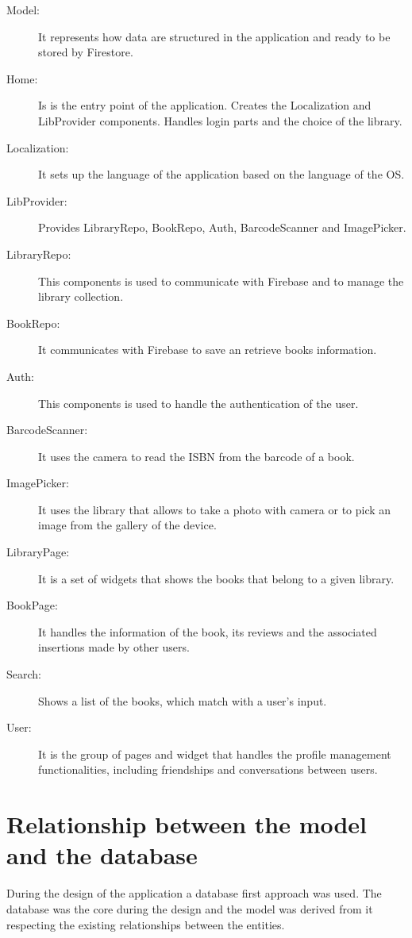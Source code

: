 \begin{description}
    \item[Model:] It represents how data are structured in the application and ready to be stored by Firestore.
    \item[Home:] Is is the entry point of the application. Creates the Localization and LibProvider components. Handles login parts and the choice of the library.
    \item[Localization:] It sets up the language of the application based on the language of the OS.
    \item[LibProvider:] Provides LibraryRepo, BookRepo, Auth, BarcodeScanner and ImagePicker.
    \item[LibraryRepo:] This components is used to communicate with Firebase and to manage the library collection.
    \item[BookRepo:] It communicates with Firebase to save an retrieve books information.
    \item[Auth:] This components is used to handle the authentication of the user.
    \item[BarcodeScanner:] It uses the camera to read the ISBN from the barcode of a book.
    \item[ImagePicker:] It uses the library that allows to take a photo with camera or to pick an image from the gallery of the device.
    \item[LibraryPage:] It is a set of widgets that shows the books that belong to a given library.
    \item[BookPage:] It handles the information of the book, its reviews and the associated insertions made by other users. 
    \item[Search:] Shows a list of the books, which match with a user's input.
    \item[User:] It is the group of pages and widget that handles the profile management functionalities, including friendships and conversations between users.
\end{description}
\clearpage
\section{Relationship between the model and the database}
During the design of the application a database first approach was used. The database was the core during the design and the model was derived from it 
respecting the existing relationships between the entities.


